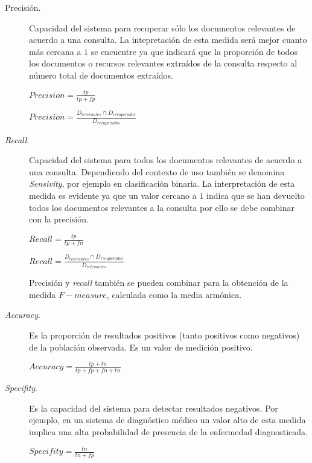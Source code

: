 \begin{description}
 \item [Precisión.] Capacidad del sistema para recuperar sólo los documentos relevantes de acuerdo 
a una consulta. La intepretación de esta medida será mejor cuanto más cercana a $1$ se encuentre ya 
que indicará que la proporción de todos los documentos o recursos relevantes extraídos de la consulta 
respecto al número total de documentos extraídos.

\begin{center}
$Precision = \frac{tp}{tp+fp} $

$Precision = \frac{D_{relevantes}\cap D_{recuperados}}{D_{recuperados}} $
\end{center}


 \item [\textit{Recall}.] Capacidad del sistema para todos los documentos relevantes 
de acuerdo a una consulta. Dependiendo del contexto de uso también se denomina \textit{Sensivity}, por ejemplo 
en clasificación binaria. La interpretación de esta medida es evidente ya que un valor cercano a $1$ indica 
que se han devuelto todos los documentos relevantes a la consulta por ello se debe combinar con la precisión.

\begin{center}
$Recall = \frac{tp}{tp+fn} $

$Recall = \frac{D_{relevantes}\cap D_{recuperados}}{D_{relevantes}} $
 
\end{center}

Precisión y \textit{recall} también se pueden combinar para la obtención de la medida $F-measure$, calculada 
como la media armónica. 

 \item [\textit{Accuracy}.] Es la proporción de resultados positivos (tanto positivos como negativos) de la población 
observada. Es un valor de medición positivo.

\begin{center}
$Accuracy = \frac{tp+tn}{tp+fp+fn+tn} $

\end{center}



 \item [\textit{Specifity}.] Es la capacidad del sistema para detectar resultados negativos. Por ejemplo, en un sistema 
de diagnóstico médico un valor alto de esta medida implica una alta probabilidad de presencia de la enfermedad 
diagnosticada.

\begin{center}
$Specifity = \frac{tn}{tn+fp} $
 
\end{center}
 
\end{description}

